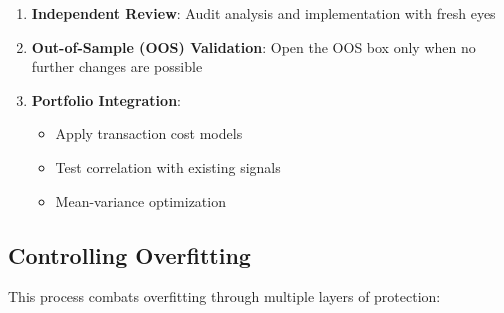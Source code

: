 \documentclass[11pt, letterpaper]{article}
\begin{document}
\begin{enumerate}
    \item \textbf{Independent Review}: Audit analysis and implementation
      with fresh eyes

    \item \textbf{Out-of-Sample (OOS) Validation}: Open the OOS box only when
      no further changes are possible

    \item \textbf{Portfolio Integration}:

      \begin{itemize}
        \item Apply transaction cost models

        \item Test correlation with existing signals

        \item Mean-variance optimization
      \end{itemize}
  \end{enumerate}

  \subsection{Controlling Overfitting}
  \label{controlling-overfitting}

  This process combats overfitting through multiple layers of protection:
\end{document}
